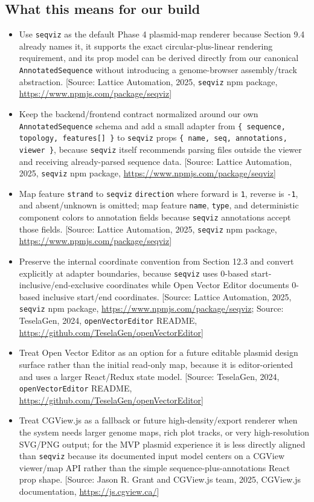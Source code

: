 \documentclass[11pt]{report}
\begin{document}
\subsection{What this means for our build}
\begin{itemize}
\item Use \texttt{seqviz} as the default Phase 4 plasmid-map renderer because Section 9.4 already names it, it supports the exact circular-plus-linear rendering requirement, and its prop model can be derived directly from our canonical \texttt{AnnotatedSequence} without introducing a genome-browser assembly/track abstraction. [Source: Lattice Automation, 2025, \texttt{seqviz} npm package, \url{https://www.npmjs.com/package/seqviz}]
\item Keep the backend/frontend contract normalized around our own \texttt{AnnotatedSequence} schema and add a small adapter from \texttt{\{ sequence, topology, features[] \}} to \texttt{seqviz} props \texttt{\{ name, seq, annotations, viewer \}}, because \texttt{seqviz} itself recommends parsing files outside the viewer and receiving already-parsed sequence data. [Source: Lattice Automation, 2025, \texttt{seqviz} npm package, \url{https://www.npmjs.com/package/seqviz}]
\item Map feature \texttt{strand} to \texttt{seqviz} \texttt{direction} where forward is \texttt{1}, reverse is \texttt{-1}, and absent/unknown is omitted; map feature \texttt{name}, \texttt{type}, and deterministic component colors to annotation fields because \texttt{seqviz} annotations accept those fields. [Source: Lattice Automation, 2025, \texttt{seqviz} npm package, \url{https://www.npmjs.com/package/seqviz}]
\item Preserve the internal coordinate convention from Section 12.3 and convert explicitly at adapter boundaries, because \texttt{seqviz} uses 0-based start-inclusive/end-exclusive coordinates while Open Vector Editor documents 0-based inclusive start/end coordinates. [Source: Lattice Automation, 2025, \texttt{seqviz} npm package, \url{https://www.npmjs.com/package/seqviz}; Source: TeselaGen, 2024, \texttt{openVectorEditor} README, \url{https://github.com/TeselaGen/openVectorEditor}]
\item Treat Open Vector Editor as an option for a future editable plasmid design surface rather than the initial read-only map, because it is editor-oriented and uses a larger React/Redux state model. [Source: TeselaGen, 2024, \texttt{openVectorEditor} README, \url{https://github.com/TeselaGen/openVectorEditor}]
\item Treat CGView.js as a fallback or future high-density/export renderer when the system needs larger genome maps, rich plot tracks, or very high-resolution SVG/PNG output; for the MVP plasmid experience it is less directly aligned than \texttt{seqviz} because its documented input model centers on a CGView viewer/map API rather than the simple sequence-plus-annotations React prop shape. [Source: Jason R. Grant and CGView.js team, 2025, CGView.js documentation, \url{https://js.cgview.ca/}]

\end{itemize}
\end{document}
